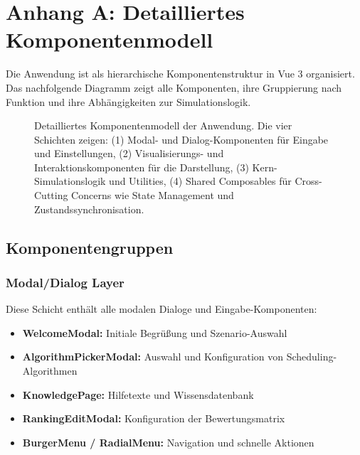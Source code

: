 \section*{Anhang A: Detailliertes Komponentenmodell}

Die Anwendung ist als hierarchische Komponentenstruktur in Vue 3 organisiert. Das nachfolgende Diagramm zeigt alle Komponenten, ihre Gruppierung nach Funktion und ihre Abhängigkeiten zur Simulationslogik.

\begin{figure}[htbp]
    \centering
    
    \caption{Detailliertes Komponentenmodell der Anwendung. Die vier Schichten zeigen: (1) Modal- und Dialog-Komponenten für Eingabe und Einstellungen, (2) Visualisierungs- und Interaktionskomponenten für die Darstellung, (3) Kern-Simulationslogik und Utilities, (4) Shared Composables für Cross-Cutting Concerns wie State Management und Zustandssynchronisation.}
    \label{fig:detailed-component-model}
\end{figure}

\subsection*{Komponentengruppen}

\subsubsection*{Modal/Dialog Layer}
Diese Schicht enthält alle modalen Dialoge und Eingabe-Komponenten:
\begin{itemize}
    \item \textbf{WelcomeModal:} Initiale Begrüßung und Szenario-Auswahl
    \item \textbf{AlgorithmPickerModal:} Auswahl und Konfiguration von Scheduling-Algorithmen
    \item \textbf{KnowledgePage:} Hilfetexte und Wissensdatenbank
    \item \textbf{RankingEditModal:} Konfiguration der Bewertungsmatrix
    \item \textbf{BurgerMenu / RadialMenu:} Navigation und schnelle Aktionen
\end{itemize}

